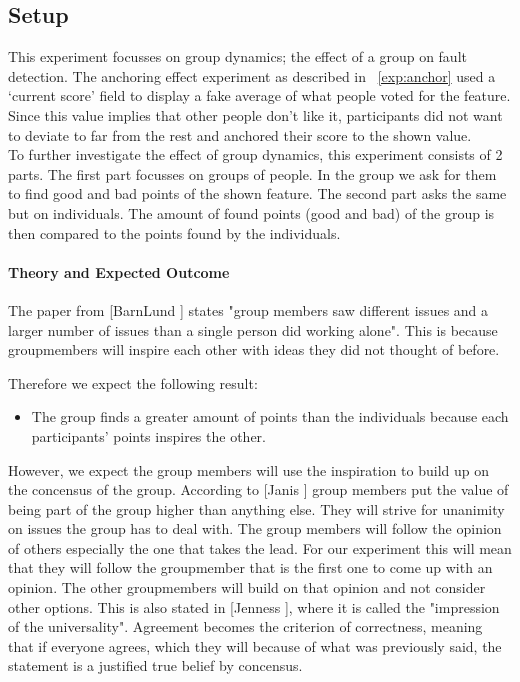 \documentclass[main.tex]{subfiles}
\begin{document}
\subsection{Setup}
This experiment focusses on group dynamics; the effect of a group on fault detection. The anchoring effect experiment as described in ~\ref{exp:anchor} used a `current score' field to display a fake average of what people voted for the feature. Since this value implies that other people don't like it, participants did not want to deviate to far from the rest and anchored their score to the shown value. \\
To further investigate the effect of group dynamics, this experiment consists of 2 parts. The first part focusses on groups of people. In the group we ask for them to find good and bad points of the shown feature. The second part asks the same but on individuals. The amount of found points (good and bad) of the group is then compared to the points found by the individuals.

\paragraph{Theory and Expected Outcome}
The paper from [BarnLund \cite{barnlund}] states "group members saw different issues and a larger number of issues than a single person did working alone". This is because groupmembers will inspire each other with ideas they did not thought of before. 

Therefore we expect the following result:
\begin{itemize}
\item The group finds a greater amount of points than the individuals because each participants' points inspires the other. 
\end{itemize}

However, we expect the group members will use the inspiration to build up on the concensus of the group.
According to [Janis \cite{janis}] group members put the value of being part of the group higher than anything else. They will strive for unanimity on issues the group has to deal with. The group members will follow the opinion of others especially the one that takes the lead. For our experiment this will mean that they will follow the groupmember that is the first one to come up with an opinion. The other groupmembers will build on that opinion and not consider other options. This is also stated in [Jenness \cite{jenness}], where it is called the "impression of the universality". Agreement becomes the criterion of correctness, meaning that if everyone agrees, which they will because of what was previously said, the statement is a justified true belief by concensus.
\end{document}
